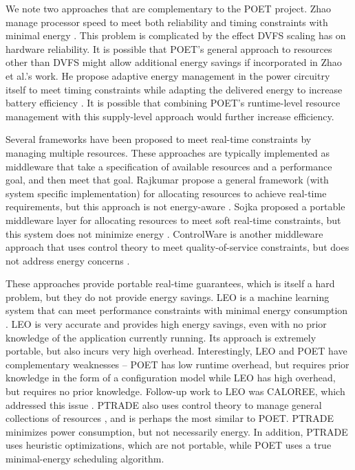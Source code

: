 We note two approaches that are complementary to the POET project.
Zhao \etal manage processor speed to meet both reliability and timing constraints with minimal energy \cite{Zhao2012}.
This problem is complicated by the effect DVFS scaling has on hardware reliability.
It is possible that POET's general approach to resources other than DVFS might allow additional energy savings if incorporated in Zhao et al.'s work.
He \etal propose adaptive energy management in the power circuitry itself to meet timing constraints while adapting the delivered energy to increase battery efficiency \cite{He2013}.
It is possible that combining POET's runtime-level resource management with this supply-level approach would further increase efficiency.

Several frameworks have been proposed to meet real-time constraints by managing multiple resources.
These approaches are typically implemented as middleware that take a specification of available resources and a performance goal, and then meet that goal.
Rajkumar \etal propose a general framework (with system specific implementation) for allocating resources to achieve real-time requirements, but this approach is not energy-aware \cite{Rajkumar}.
Sojka \etal proposed a portable middleware layer for allocating resources to meet soft real-time constraints, but this system does not minimize energy \cite{Sojka}.
ControlWare is another middleware approach that uses control theory to meet quality-of-service constraints, but does not address energy concerns \cite{ControlWare}.

These approaches provide portable real-time guarantees, which is itself a hard problem, but they do not provide energy savings.
LEO is a machine learning system that can meet performance constraints with minimal energy consumption \cite{LEO}.
LEO is very accurate and provides high energy savings, even with no prior knowledge of the application currently running.
Its approach is extremely portable, but also incurs very high overhead.
Interestingly, LEO and POET have complementary weaknesses -- POET has low runtime overhead, but requires prior knowledge in the form of a configuration model while LEO has high overhead, but requires no prior knowledge.
Follow-up work to LEO was CALOREE, which addressed this issue \cite{CALOREE}.
PTRADE also uses control theory to manage general collections of resources \cite{PTRADE}, and is perhaps the most similar to POET.
PTRADE minimizes power consumption, but not necessarily energy.
In addition, PTRADE uses heuristic optimizations, which are not portable, while POET uses a true minimal-energy scheduling algorithm.


